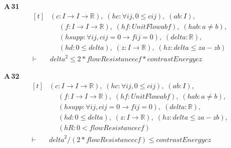 \noindent\textbf{A\,31}\quad{}
{\footnotesize\[ \begin{aligned}[t]
&(\mathit{c} : \mathit{I} \to \mathit{I} \to \mathbb{R} ),\; (\mathit{hc} : \forall \mathit{i} \mathit{j}, 0 \leq \mathit{c} \mathit{i} \mathit{j}),\; (\mathit{a} \mathit{b} : \mathit{I}),\\
&\quad \; (\mathit{f} : \mathit{I} \to \mathit{I} \to \mathbb{R} ),\; (\mathit{hf} : \mathit{UnitFlow} \mathit{a} \mathit{b} \mathit{f}),\; (\mathit{hab} : \mathit{a} \neq \mathit{b}),\\
&\quad \; (\mathit{hsupp} : \forall \mathit{i} \mathit{j}, \mathit{c} \mathit{i} \mathit{j} = 0 \to \mathit{f} \mathit{i} \mathit{j} = 0),\; (\mathit{delta} : \mathbb{R} ),\\
&\quad \; (\mathit{hd} : 0 \leq \mathit{delta}),\; (\mathit{z} : \mathit{I} \to \mathbb{R} ),\; (\mathit{hz} : \mathit{delta} \leq \mathit{z} \mathit{a}-\mathit{z} \mathit{b})\\
\vdash\;&\mathit{delta}^{2} \leq 2*\mathit{flowResistance} \mathit{c} \mathit{f}*\mathit{contrastEnergy} \mathit{c} \mathit{z}
\end{aligned} \]}

\noindent\textbf{A\,32}\quad{}
{\footnotesize\[ \begin{aligned}[t]
&(\mathit{c} : \mathit{I} \to \mathit{I} \to \mathbb{R} ),\; (\mathit{hc} : \forall \mathit{i} \mathit{j}, 0 \leq \mathit{c} \mathit{i} \mathit{j}),\; (\mathit{a} \mathit{b} : \mathit{I}),\\
&\quad \; (\mathit{f} : \mathit{I} \to \mathit{I} \to \mathbb{R} ),\; (\mathit{hf} : \mathit{UnitFlow} \mathit{a} \mathit{b} \mathit{f}),\; (\mathit{hab} : \mathit{a} \neq \mathit{b}),\\
&\quad \; (\mathit{hsupp} : \forall \mathit{i} \mathit{j}, \mathit{c} \mathit{i} \mathit{j} = 0 \to \mathit{f} \mathit{i} \mathit{j} = 0),\; (\mathit{delta} : \mathbb{R} ),\\
&\quad \; (\mathit{hd} : 0 \leq \mathit{delta}),\; (\mathit{z} : \mathit{I} \to \mathbb{R} ),\; (\mathit{hz} : \mathit{delta} \leq \mathit{z} \mathit{a}-\mathit{z} \mathit{b}),\\
&\quad \; (\mathit{hR} : 0 < \mathit{flowResistance} \mathit{c} \mathit{f})\\
\vdash\;&\mathit{delta}^{2}/(2*\mathit{flowResistance} \mathit{c} \mathit{f}) \leq \mathit{contrastEnergy} \mathit{c} \mathit{z}
\end{aligned} \]}

